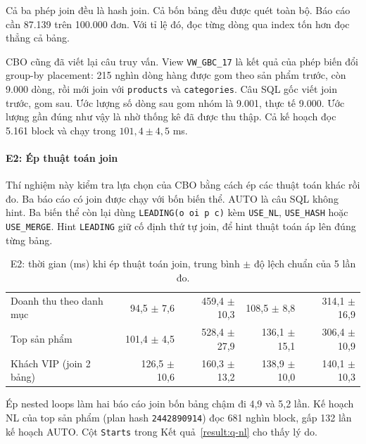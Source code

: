 Cả ba phép join đều là hash join. Cả bốn bảng đều được quét toàn bộ. Báo cáo cần 87.139 trên 100.000 đơn. Với tỉ lệ đó, đọc từng dòng qua index tốn hơn đọc thẳng cả bảng.

CBO cũng đã viết lại câu truy vấn. View \texttt{VW\_GBC\_17} là kết quả của phép biến đổi group-by placement: 215 nghìn dòng hàng được gom theo sản phẩm trước, còn 9.000 dòng, rồi mới join với \texttt{products} và \texttt{categories}. Câu SQL gốc viết join trước, gom sau. Ước lượng số dòng sau gom nhóm là 9.001, thực tế 9.000. Ước lượng gần đúng như vậy là nhờ thống kê đã được thu thập. Cả kế hoạch đọc 5.161 block và chạy trong $101{,}4 \pm 4{,}5$ ms.

\paragraph{E2: Ép thuật toán join}\label{sec:q-e2}

Thí nghiệm này kiểm tra lựa chọn của CBO bằng cách ép các thuật toán khác rồi đo. Ba báo cáo có join được chạy với bốn biến thể. AUTO là câu SQL không hint. Ba biến thể còn lại dùng \texttt{LEADING(o oi p c)} kèm \texttt{USE\_NL}, \texttt{USE\_HASH} hoặc \texttt{USE\_MERGE}. Hint \texttt{LEADING} giữ cố định thứ tự join, để hint thuật toán áp lên đúng từng bảng.

\begin{table}[!htbp]
\centering
\caption{E2: thời gian (ms) khi ép thuật toán join, trung bình $\pm$ độ lệch chuẩn của 5 lần đo.}\label{tab:q-hints}
\reporttablesetup
\begin{tabularx}{\linewidth}{|L|r|r|r|r|}
\hline
{}
 &  &  &  &  \\ \hline
Doanh thu theo danh mục & 94,5 $\pm$ 7,6 & 459,4 $\pm$ 10,3 & 108,5 $\pm$ 8,8 & 314,1 $\pm$ 16,9 \\ \hline
Top sản phẩm & 101,4 $\pm$ 4,5 & 528,4 $\pm$ 27,9 & 136,1 $\pm$ 15,1 & 306,4 $\pm$ 10,9 \\ \hline
Khách VIP (join 2 bảng) & 126,5 $\pm$ 10,6 & 160,3 $\pm$ 13,2 & 138,9 $\pm$ 10,0 & 140,1 $\pm$ 10,3 \\ \hline
\end{tabularx}
\end{table}

Ép nested loops làm hai báo cáo join bốn bảng chậm đi 4,9 và 5,2 lần. Kế hoạch NL của top sản phẩm (plan hash \texttt{2442890914}) đọc 681 nghìn block, gấp 132 lần kế hoạch AUTO. Cột \texttt{Starts} trong Kết quả~\ref{result:q-nl} cho thấy lý do.

